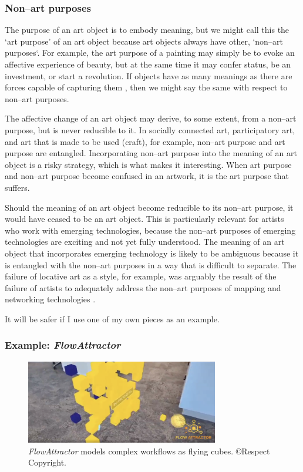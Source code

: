 \documentclass[letterpaper]{article}
\begin{document}
    \subsubsection{Non–art purposes}

    The purpose of an art object is to embody meaning, but we might call this the ‘art purpose’ of an art object because art objects always have other, ‘non–art purposes‘. For example, the art purpose of a painting may simply be to evoke an affective experience of beauty, but at the same time it may confer status, be an investment, or start a revolution. If objects have as many meanings as there are forces capable of capturing them \citep[p.4]{DeleuzeNtschAndPhlsphy2006}, then we might say the same with respect to non–art purposes.

    The affective change of an art object may derive, to some extent, from a non–art purpose, but is never reducible to it. In socially connected art, participatory art, and art that is made to be used (craft), for example, non–art purpose and art purpose are entangled. Incorporating non–art purpose into the meaning of an art object is a risky strategy, which is what makes it interesting. When art purpose and non–art purpose become confused in an artwork, it is the art purpose that suffers. 
    
    Should the meaning of an art object become reducible to its non–art purpose, it would have ceased to be an art object. This is particularly relevant for artists who work with emerging technologies, because the non–art purposes of emerging technologies are exciting and not yet fully understood. The meaning of an art object that incorporates emerging technology is likely to be ambiguous because it is entangled with the non–art purposes in a way that is difficult to separate. The failure of locative art as a style, for example, was arguably the result of the failure of artists to adequately address the non–art purposes of mapping and networking technologies \citep{questioningTheFrame2004}.

    It will be safer if I use one of my own pieces as an example.

    \subsubsection{Example: \emph{FlowAttractor}}

    \begin{figure}[h]
    \includegraphics[width=3.31in]{flow-attractor.png}
    \caption{\emph{FlowAttractor} models complex workflows as flying cubes. \copyright Respect Copyright.}
    \end{figure}
\end{document}
